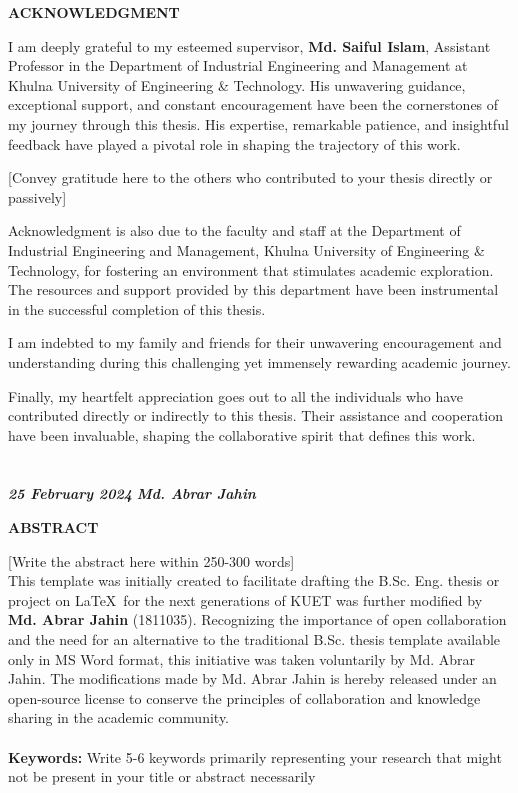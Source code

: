 \documentclass[a4paper,12pt,oneside]{book}
\newcommand{\blanklineR}{\hfill \\} %
\newcommand{\HeadingR}[1]{%
{\large			%
\bfseries{#1}}}
\begin{document}
\newpage
{} \label{ack}

\begin{center}
\HeadingR{\MakeUppercase{Acknowledgment}}
\end{center}
I am deeply grateful to my esteemed supervisor, \textbf{Md. Saiful Islam}, Assistant Professor in the Department of Industrial Engineering and Management at Khulna University of Engineering \& Technology. His unwavering guidance, exceptional support, and constant encouragement have been the cornerstones of my journey through this thesis. His expertise, remarkable patience, and insightful feedback have played a pivotal role in shaping the trajectory of this work.

[Convey gratitude here to the others who contributed to your thesis directly or passively]

Acknowledgment is also due to the faculty and staff at the Department of Industrial Engineering and Management, Khulna University of Engineering \& Technology, for fostering an environment that stimulates academic exploration. The resources and support provided by this department have been instrumental in the successful completion of this thesis.

I am indebted to my family and friends for their unwavering encouragement and understanding during this challenging yet immensely rewarding academic journey.

Finally, my heartfelt appreciation goes out to all the individuals who have contributed directly or indirectly to this thesis. Their assistance and cooperation have been invaluable, shaping the collaborative spirit that defines this work.\\

\blanklineR \blanklineR
\textit{\textbf{25 February 2024}} \hfill \textit{\textbf{Md. Abrar Jahin}}

\newpage
{} \label{abstr}

\begin{center}
\HeadingR{\MakeUppercase{Abstract}}
\end{center}
[Write the abstract here within 250-300 words]\\
This template was initially created to facilitate drafting the B.Sc. Eng. thesis or project on \LaTeX\ for the next generations of KUET was further modified by \textbf{Md. Abrar Jahin} (1811035). Recognizing the importance of open collaboration and the need for an alternative to the traditional B.Sc. thesis template available only in MS Word format, this initiative was taken voluntarily by Md. Abrar Jahin. The modifications made by Md. Abrar Jahin is hereby released under an open-source license to conserve the principles of collaboration and knowledge sharing in the academic community.
\\\\
\textbf{Keywords:} Write 5-6 keywords primarily representing your research that might not be present in your title or abstract necessarily
\end{document}
